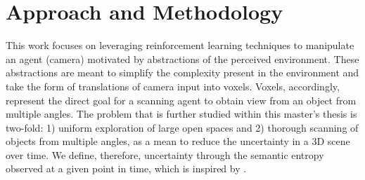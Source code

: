     

\section{Approach and Methodology}\label{chap:1:approach-methodology}
This work focuses on leveraging reinforcement learning techniques to manipulate an agent (camera) motivated by abstractions of the perceived environment. These abstractions are meant to simplify the complexity present in the environment and take the form of translations of camera input into voxels. Voxels, accordingly, represent the direct goal for a scanning agent to obtain view from an object from multiple angles. The problem that is further studied within this master's thesis is two-fold: 1) uniform exploration of large open spaces and 2) thorough scanning of objects from multiple angles, as a mean to reduce the uncertainty in a 3D scene over time. We define, therefore, uncertainty through the semantic entropy observed at a given point in time, which is inspired by \textcite{chaplot2020semantic}.

